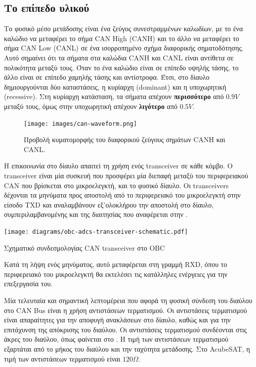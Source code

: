 \documentclass[a4paper,nobib,justified]{tufte-book}
\begin{document}
\subsection{Το επίπεδο υλικού}
Το φυσικό μέσο μετάδοσης είναι ένα ζεύγος συνεστραμμένων καλωδίων, με το ένα καλώδιο να μεταφέρει το σήμα CAN High (CANH) και το άλλο να μεταφέρει το σήμα CAN Low (CANL) σε ένα ισορροπημένο σχήμα διαφορικής σηματοδότησης. Αυτό σημαίνει ότι τα σήματα στα καλώδια CANH και CANL είναι αντίθετα σε πολικότητα μεταξύ τους. Όταν το ένα καλώδιο είναι σε επίπεδο υψηλής τάσης, το άλλο είναι σε επίπεδο χαμηλής τάσης και αντίστροφα. Έτσι, στο δίαυλο δημιουργούνται δύο καταστάσεις, η κυρίαρχη (dominant) και η υποχωρητική (recessive). Στη κυρίαρχη κατάσταση, τα σήματα απέχουν \textbf{περισσότερο} από $0.9V$ μεταξύ τους, όμως στην υποχωρητική απέχουν \textbf{λιγότερο} από $0.5V$.
\begin{figure}
	\texttt{[image: images/can-waveform.png]}
	\label{fig:can-waveform}
	\caption[Προβολή κυματομορφών CAN]{Προβολή κυματομορφής του διαφορικού ζεύγους σημάτων CANH και CANL. \cite{digikey2021canbus}}
\end{figure}

Η επικοινωνία στο δίαυλο απαιτεί τη χρήση ενός transceiver σε κάθε κόμβο. Ο transceiver είναι μία συσκευή που προσφέρει μία διεπαφή μεταξύ του περιφερειακού CAN που βρίσκεται στο μικροελεγκτή, και το φυσικό δίαυλο. Οι transceivers δέχονται τα μηνύματα προς αποστολή από το περιφερειακό του μικροελεγκτή στην είσοδο TXD και αναλαμβάνουν εξ'ολοκλήρου την αποστολή στο δίαυλο, συμπεριλαμβανομένης και της διαιτησίας που αναφέρεται στην . \begin{marginfigure}
	\texttt{[image: diagrams/obc-adcs-transceiver-schematic.pdf]}
	\label{fig:transceiver-schematic}
	\caption[Σχηματικό συνδεσμολογίας CAN transceiver]{Σχηματικό συνδεσμολογίας CAN transceiver στο OBC}
\end{marginfigure}
Κατά τη λήψη ενός μηνύματος, αυτό μεταφέρεται στη γραμμή RXD, όπου το περιφερειακό του μικροελεγκτή θα εκτελέσει τις κατάλληλες ενέργειες για την επεξεργασία του.


Μία τελευταία και σημαντική λεπτομέρεια που αφορά τη φυσική σύνδεση του διαύλου στο CAN Bus είναι η χρήση αντιστάσεων τερματισμού. Οι αντιστάσεις τερματισμού είναι απαραίτητες για την αποφυγή ανακλάσεων στο δίαυλο, καθώς και για την επιτάχυνση της απόκρισης του διαύλου. Οι αντιστάσεις τερματισμού συνδέονται στις άκρες του διαύλου, όπως φαίνεται στο . Η τιμή των αντιστάσεων τερματισμού εξαρτάται από το μήκος του διαύλου και την ταχύτητα μετάδοσης. Στο AcubeSAT, η τιμή των αντιστάσεων τερματισμού είναι $120\Omega$.
\end{document}
